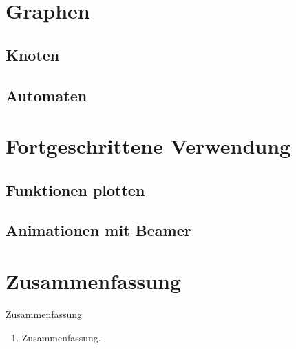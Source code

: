 
\section{Graphen}

\subsection{Knoten}

\subsection{Automaten}

\section{Fortgeschrittene Verwendung}

\subsection{Funktionen plotten}

\subsection{Animationen mit Beamer}

\section*{Zusammenfassung}

\begin{frame}{Zusammenfassung}
  \begin{enumerate}
    \item Zusammenfassung.
  \end{enumerate}
\end{frame}